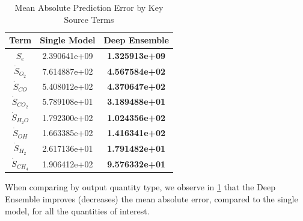 \documentclass[conf]{new-aiaa}
\begin{document}
\begin{table}[H]
    \caption{Mean Absolute Prediction Error by Key Source Terms}
    \label{tab:mae_sm_vs_ensemble_flames}
    \centering
    \begin{tabular}{|c|c|c|}
         \hline
        Term &  Single Model & Deep Ensemble \\
        \hline
       ${S}_{e}$ &          2.390641e+09 &           \textbf{1.325913e+09} \\
        $\dot{S}_{O_{2}}$ &          7.614887e+02 &           \textbf{4.567584e+02} \\
        $\dot{S}_{CO}$ &          5.408012e+02 &           \textbf{4.370647e+02} \\
        $\dot{S}_{CO_{2}}$ &          5.789108e+01 &           \textbf{3.189488e+01} \\
        $\dot{S}_{H_{2}O}$ &          1.792300e+02 &           \textbf{1.024356e+02} \\
        $\dot{S}_{OH}$ &          1.663385e+02 &           \textbf{1.416341e+02} \\
        $\dot{S}_{H_{2}}$ &          2.617136e+01 &           \textbf{1.791482e+01} \\
        $\dot{S}_{CH_{4}}$ &          1.906412e+02 &           \textbf{9.576332e+01} \\
        \hline
    \end{tabular}
\end{table}

When comparing by output quantity type, we observe in \ref{tab:mae_sm_vs_ensemble_flames} that the Deep Ensemble improves (decreases) the mean absolute error, compared to the single model, for all the quantities of interest.
%  
\end{document}
